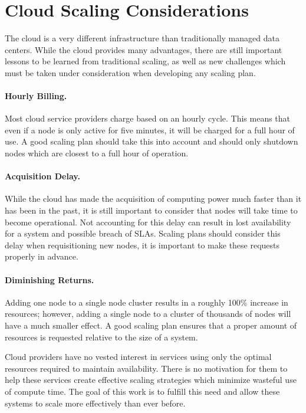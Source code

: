 \section{Cloud Scaling Considerations}
\label{sec:considerations}
The cloud is a very different infrastructure than traditionally managed data centers. While the cloud provides many advantages, there are still important lessons to be learned from traditional scaling, as well as new challenges which must be taken under consideration when developing any scaling plan.

\paragraph{Hourly Billing.} Most cloud service providers charge based on an hourly cycle. This means that even if a node is only active for five minutes, it will be charged for a full hour of use. A good scaling plan should take this into account and should only shutdown nodes which are closest to a full hour of operation.

\paragraph{Acquisition Delay.} While the cloud has made the acquisition of computing power much faster than it has been in the past, it is still important to consider that nodes will take time to become operational. Not accounting for this delay can result in lost availability for a system and possible breach of SLAs. Scaling plans should consider this delay when requisitioning new nodes, it is important to make these requests properly in advance.

\paragraph{Diminishing Returns.} Adding one node to a single node cluster results in a roughly 100\% increase in resources; however, adding a single node to a cluster of thousands of nodes will have a much smaller effect. A good scaling plan ensures that a proper amount of resources is requested relative to the size of a system.

Cloud providers have no vested interest in services using only the optimal resources required to maintain availability. There is no motivation for them to help these services create effective scaling strategies which minimize wasteful use of compute time. The goal of this work is to fulfill this need and allow these systems to scale more effectively than ever before.

